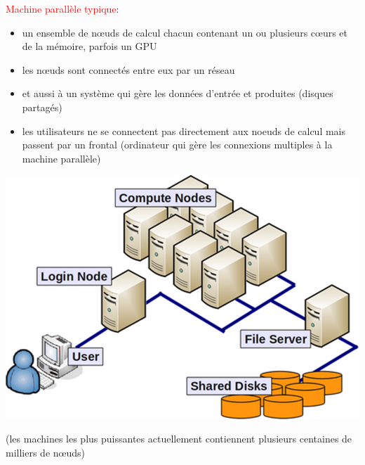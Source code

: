 \documentclass{beamer}
\begin{document}
\begin{frame}

\textcolor{red}{Machine parallèle typique}: 
\begin{itemize}
	\item un ensemble de n\oe uds de calcul chacun contenant un ou plusieurs cœurs et de la m\'emoire, parfois un GPU
	\item les nœuds sont connect\'es entre eux par un r\'eseau
	\item et aussi à un système qui gère les données d'entrée et produites (disques partagés)
	\item les utilisateurs ne se connectent pas directement aux noeuds de calcul mais passent par un frontal (ordinateur qui gère les connexions multiples à la machine parallèle)
\end{itemize}

\vfill
\begin{center}
\includegraphics[scale=0.14]{../../Images/ParallelMachine.png}
\end{center}

(les machines les plus puissantes actuellement contiennent plusieurs centaines de milliers de n\oe uds)
\end{frame}
\end{document}
